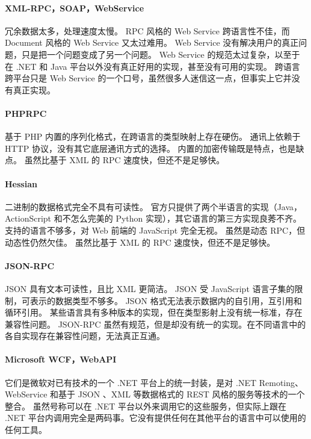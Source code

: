 \documentclass{book}
\begin{document}
\paragraph{XML-RPC，SOAP，WebService}

冗余数据太多，处理速度太慢。
RPC 风格的 Web Service 跨语言性不佳，而 Document 风格的 Web Service 又太过难用。
Web Service 没有解决用户的真正问题，只是把一个问题变成了另一个问题。
Web Service 的规范太过复杂，以至于在 .NET 和 Java 平台以外没有真正好用的实现，甚至没有可用的实现。
跨语言跨平台只是 Web Service 的一个口号，虽然很多人迷信这一点，但事实上它并没有真正实现。

\paragraph{PHPRPC}

基于 PHP 内置的序列化格式，在跨语言的类型映射上存在硬伤。
通讯上依赖于 HTTP 协议，没有其它底层通讯方式的选择。
内置的加密传输既是特点，也是缺点。
虽然比基于 XML 的 RPC 速度快，但还不是足够快。

\paragraph{Hessian}

二进制的数据格式完全不具有可读性。
官方只提供了两个半语言的实现（Java，ActionScript 和不怎么完美的 Python 实现），其它语言的第三方实现良莠不齐。
支持的语言不够多，对 Web 前端的 JavaScript 完全无视。
虽然是动态 RPC，但动态性仍然欠佳。
虽然比基于 XML 的 RPC 速度快，但还不是足够快。

\paragraph{JSON-RPC}

JSON 具有文本可读性，且比 XML 更简洁。
JSON 受 JavaScript 语言子集的限制，可表示的数据类型不够多。
JSON 格式无法表示数据内的自引用，互引用和循环引用。
某些语言具有多种版本的实现，但在类型影射上没有统一标准，存在兼容性问题。
JSON-RPC 虽然有规范，但是却没有统一的实现。在不同语言中的各自实现存在兼容性问题，无法真正互通。

\paragraph{Microsoft WCF，WebAPI}

它们是微软对已有技术的一个 .NET 平台上的统一封装，是对 .NET Remoting、WebService 和基于 JSON 、XML 等数据格式的 REST 风格的服务等技术的一个整合。
虽然号称可以在 .NET 平台以外来调用它的这些服务，但实际上跟在 .NET 平台内调用完全是两码事。它没有提供任何在其他平台的语言中可以使用的任何工具。
\end{document}
